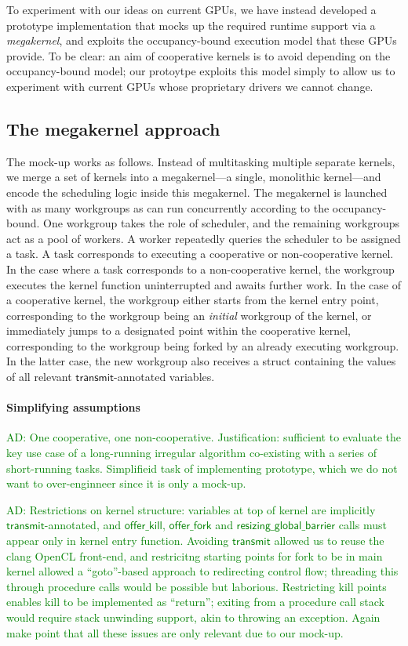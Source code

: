 \documentclass[numbers,nocopyrightspace,10pt]{sigplanconf}
\newcommand{\ADComment}[1]{\textcolor{green}{AD: #1}}
\newcommand{\transmit}{\mathsf{transmit}}
\newcommand{\offerfork}{\mathsf{offer\_fork}}
\newcommand{\offerkill}{\mathsf{offer\_kill}}
\newcommand{\resizingglobalbarrier}{\mathsf{resizing\_global\_barrier}}
\begin{document}
To experiment with our ideas on current GPUs, we have instead
developed a prototype implementation that mocks up the required
runtime support via a \emph{megakernel}, and exploits the
occupancy-bound execution model that these GPUs provide.  To be clear:
an aim of cooperative kernels is to avoid depending on the
occupancy-bound model; our protoytpe exploits this model simply to
allow us to experiment with current GPUs whose proprietary drivers we
cannot change.

\subsection{The megakernel approach}

The mock-up works as follows.  Instead of multitasking multiple
separate kernels, we merge a set of kernels into a megakernel---a
single, monolithic kernel---and encode the scheduling logic inside
this megakernel.  The megakernel is launched with as many workgroups
as can run concurrently according to the occupancy-bound.  One
workgroup takes the role of scheduler, and the remaining workgroups
act as a pool of workers.  A worker repeatedly queries the scheduler
to be assigned a task.  A task corresponds to executing a cooperative
or non-cooperative kernel.  In the case where a task corresponds to a
non-cooperative kernel, the workgroup executes the kernel function
uninterrupted and awaits further work.  In the case of a cooperative
kernel, the workgroup either starts from the kernel entry point,
corresponding to the workgroup being an \emph{initial} workgroup of
the kernel, or immediately jumps to a designated point within the
cooperative kernel, corresponding to the workgroup being forked by an
already executing workgroup.  In the latter case, the new workgroup
also receives a struct containing the values of all relevant
$\transmit$-annotated variables.

\paragraph{Simplifying assumptions}

\ADComment{One cooperative, one non-cooperative.  Justification: sufficient to evaluate the key use case of a long-running irregular algorithm co-existing with a series of short-running tasks.  Simplifieid task of implementing prototype, which we do not want to over-enginneer since it is only a mock-up.}

\ADComment{Restrictions on kernel structure: variables at top of kernel are implicitly $\transmit$-annotated, and $\offerkill$, $\offerfork$ and $\resizingglobalbarrier$ calls must appear only in kernel entry function.  Avoiding $\transmit$ allowed us to reuse the clang OpenCL front-end, and restricitng starting points for fork to be in main kernel allowed a ``goto''-based approach to redirecting control flow; threading this through procedure calls would be possible but laborious.  Restricting kill points enables kill to be implemented as ``return''; exiting from a procedure call stack would require stack unwinding support, akin to throwing an exception.  Again make point that all these issues are only relevant due to our mock-up.}
\end{document}
